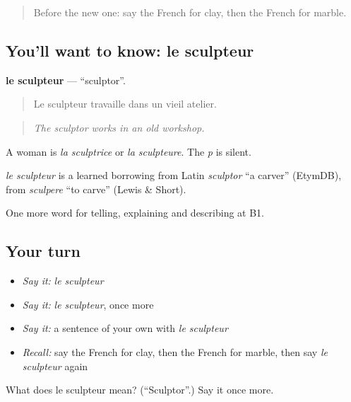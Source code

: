 \label{lesson:FR-C517-sculpteur}



\begin{quote}
Before the new one: say the French for clay, then the French for marble.
\end{quote}

\subsection*{You'll want to know: le sculpteur}
\textbf{le sculpteur} — \textquotedblleft{}sculptor\textquotedblright{}.

\begin{quote}
Le sculpteur travaille dans un vieil atelier.
\end{quote}

\begin{quote}
\emph{The sculptor works in an old workshop.}
\end{quote}

A woman is \emph{la sculptrice} or \emph{la sculpteure}. The \emph{p} is silent.

\begin{cousinweb}
\emph{le sculpteur} is a learned borrowing from Latin \emph{sculptor} \textquotedblleft{}a carver\textquotedblright{} (EtymDB), from \emph{sculpere} \textquotedblleft{}to carve\textquotedblright{} (Lewis \& Short).
\end{cousinweb}

\begin{grammarlens}[title={What you've built}]
One more word for telling, explaining and describing at B1.
\end{grammarlens}

\subsection*{Your turn}
\begin{itemize}
\raggedright
  \item \emph{Say it:} \emph{le sculpteur}
  \item \emph{Say it:} \emph{le sculpteur}, once more
  \item \emph{Say it:} a sentence of your own with \emph{le sculpteur}
  \item \emph{Recall:} say the French for clay, then the French for marble, then say \emph{le sculpteur} again
\end{itemize}

\begin{tcolorbox}[breakable,colback=teal!4,colframe=teal!35!black,title={Before you move on}]
What does le sculpteur mean? (\textquotedblleft{}Sculptor\textquotedblright{}.) Say it once more.
\end{tcolorbox}
